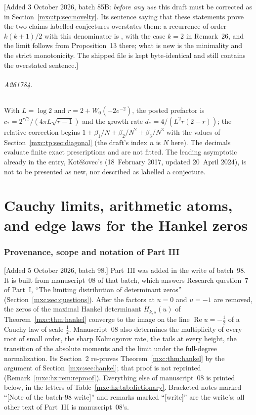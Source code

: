 \documentclass[11pt]{article}
\numberwithin{equation}{section}
\theoremstyle{definition}
\theoremstyle{remark}
\begin{document}
[Added 3 October 2026, batch 85B: \emph{before any use} this draft must be
corrected as in Section~\ref{mxc:tp:sec:novelty}. Its sentence saying
that these statements prove the two claims labelled conjectures overstates
them: a recurrence of order $k(k+1)/2$ with this denominator is
\cite[Proposition~25]{mpr2009}, with the case $k=2$ in Remark~26, and the
limit follows from Proposition~13 there; what is new is the minimality
and the strict monotonicity. The shipped file is kept byte-identical and
still contains the overstated sentence.]

\paragraph{A261784.} With $L=\log2$ and $r=2+W_0(-2e^{-2})$, the posted
prefactor is $c_*=2^{r/2}/(4\pi L\sqrt{r-1})$ and the growth rate
$d_*=4/(L^2r(2-r))$; the relative correction begins
$1+\beta_1/N+\beta_2/N^2+\beta_3/N^3$ with the values of
Section~\ref{mxc:tp:sec:diagonal} (the draft's index $n$ is $N$ here). The
decimals evaluate finite exact prescriptions and are not fitted. The
leading asymptotic already in the entry, Kot\v{e}\v{s}ovec's
(18~February 2017, updated 20~April 2024), is not to be presented as new,
nor described as labelled a conjecture.

\part{Cauchy limits, arithmetic atoms, and edge laws for the Hankel zeros}
\label{mxc:hz:part}

\section{Provenance, scope and notation of Part III}\label{mxc:hz:sec:front}

[Added 5 October 2026, batch 98.] Part~III was added in the write of
batch~98. It is built from manuscript~08 of that batch, which answers
Research question~7 of Part~I, ``The limiting distribution of determinant
zeros'' (Section~\ref{mxc:sec:questions}). After the factors at $u=0$ and
$u=-1$ are removed, the zeros of the maximal Hankel determinant
$H_{k,s}(u)$ of Theorem~\ref{mxc:thm:hankel} converge to the image on the
line $\operatorname{Re}u=-\frac12$ of a Cauchy law of scale $\frac12$.
Manuscript~08 also determines the multiplicity of every root of small
order, the sharp Kolmogorov rate, the tails at every height, the
transition of the absolute moments and the limit under the full-degree
normalization. Its Section~2 re-proves Theorem~\ref{mxc:thm:hankel} by the
argument of Section~\ref{mxc:sec:hankel}; that proof is not reprinted
(Remark~\ref{mxc:hz:rem:reproof}). Everything else of manuscript~08 is
printed below, in the letters of Table~\ref{mxc:hz:tab:dictionary}.
Bracketed notes marked ``[Note of the batch-98 write]'' and remarks marked
``[write]'' are the write's; all other text of Part~III is manuscript~08's.
\end{document}
